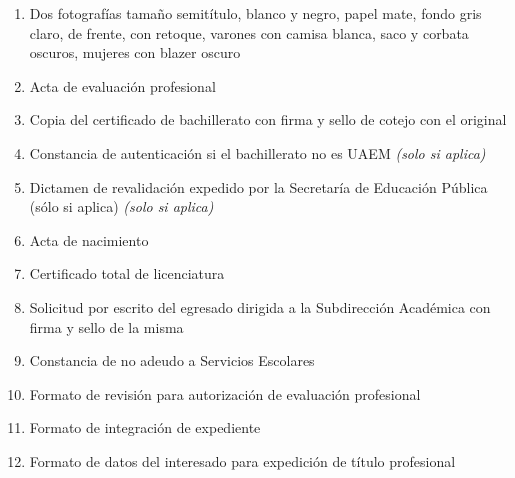 \begin{enumerate}
  \item Dos fotografías tamaño semitítulo, blanco y negro, papel mate, fondo gris claro, de frente, con retoque, varones con camisa blanca, saco y corbata oscuros, mujeres con blazer oscuro
  \item Acta de evaluación profesional
  \item Copia del certificado de bachillerato con firma y sello de cotejo con el original
  \item Constancia de autenticación si el bachillerato no es UAEM \emph{(solo si aplica)}
  \item Dictamen de revalidación expedido por la Secretaría de Educación Pública (sólo si aplica) \emph{(solo si aplica)}
  \item Acta de nacimiento
  \item Certificado total de licenciatura
  \item Solicitud por escrito del egresado dirigida a la Subdirección Académica con firma y sello de la misma
  \item Constancia de no adeudo a Servicios Escolares
  \item Formato de revisión para autorización de evaluación profesional
  \item Formato de integración de expediente
  \item Formato de datos del interesado para expedición de título profesional
\end{enumerate}
